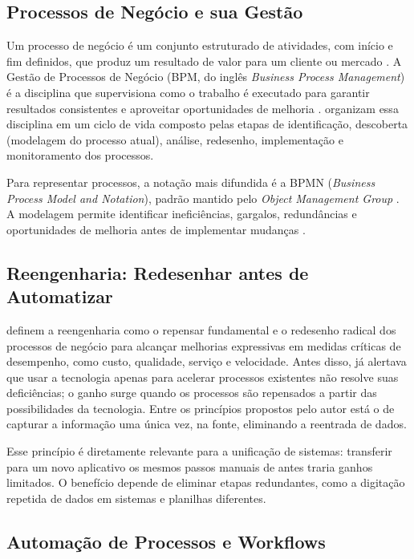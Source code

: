 \subsection{Processos de Negócio e sua Gestão}

Um processo de negócio é um conjunto estruturado de atividades, com início e fim definidos, que produz um resultado de valor para um cliente ou mercado \citep{davenport1993}. A Gestão de Processos de Negócio (BPM, do inglês \textit{Business Process Management}) é a disciplina que supervisiona como o trabalho é executado para garantir resultados consistentes e aproveitar oportunidades de melhoria \citep{dumas2018}. \citet{dumas2018} organizam essa disciplina em um ciclo de vida composto pelas etapas de identificação, descoberta (modelagem do processo atual), análise, redesenho, implementação e monitoramento dos processos.

Para representar processos, a notação mais difundida é a BPMN (\textit{Business Process Model and Notation}), padrão mantido pelo \textit{Object Management Group} \citep{dumas2018}. A modelagem permite identificar ineficiências, gargalos, redundâncias e oportunidades de melhoria antes de implementar mudanças \citep{aguilarsaven2004,sharp2009}.

\subsection{Reengenharia: Redesenhar antes de Automatizar}

\citet{hammerchampy1993} definem a reengenharia como o repensar fundamental e o redesenho radical dos processos de negócio para alcançar melhorias expressivas em medidas críticas de desempenho, como custo, qualidade, serviço e velocidade. Antes disso, \citet{hammer1990} já alertava que usar a tecnologia apenas para acelerar processos existentes não resolve suas deficiências; o ganho surge quando os processos são repensados a partir das possibilidades da tecnologia. Entre os princípios propostos pelo autor está o de capturar a informação uma única vez, na fonte, eliminando a reentrada de dados.

Esse princípio é diretamente relevante para a unificação de sistemas: transferir para um novo aplicativo os mesmos passos manuais de antes traria ganhos limitados. O benefício depende de eliminar etapas redundantes, como a digitação repetida de dados em sistemas e planilhas diferentes.

\subsection{Automação de Processos e Workflows}

